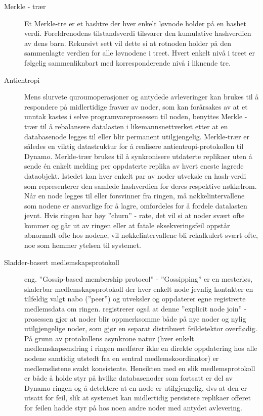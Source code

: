 \begin{description}
  \item [Merkle - trær] Et Merkle-tre er et hashtre der hver enkelt løvnode holder på en hashet verdi. Foreldrenodens tilstandsverdi tilsvarer den kumulative hashverdien av dens barn. Rekursivt sett vil dette si at rotnoden holder på den sammenlagte verdien for alle løvnodene i treet. Hvert enkelt nivå i treet er følgelig sammenliknbart med korresponderende nivå i liknende tre.
  \item [Antientropi] Mens slurvete quroumoperasjoner og antydede avleveringer kan brukes til å respondere på midlertidige fravær av noder, som kan forårsakes av at et unntak kastes i selve programvareprosessen til noden, benyttes Merkle - trær til å rebalansere datalasten i likemannsnettverket etter at en databasenode legges til eller blir permanent utilgjengelig. Merkle-trær er således en viktig datastruktur for å realisere antientropi-protokollen til Dynamo. Merkle-trær brukes til å synkronisere utdaterte replikaer uten å sende én enkelt melding per oppdaterte replika av hvert eneste lagrede dataobjekt. Istedet kan hver enkelt par av noder utveksle en hash-verdi som representerer den samlede hashverdien for deres respektive nøkkelrom. Når en node legges til eller forsvinner fra ringen, må nøkkelintervallene som nodene er ansvarlige for å lagre, omfordeles for å fordele datalasten jevnt. Hvis ringen har høy ''churn'' - rate, det vil si at noder svært ofte kommer og går ut av ringen eller at fatale eksekveringsfeil oppstår abnormalt ofte hos nodene, vil nøkkelintervallene bli rekalkulert svært ofte, noe som hemmer ytelsen til systemet.
  \item [Sladder-basert medlemskapsprotokoll] eng. ''Gossip-based member\-ship protocol'' -  ''Gossipping'' er en mesterløs, skalerbar medlemskapsprotokoll der hver enkelt node jevnlig kontakter en tilfeldig valgt nabo (''peer'') og utveksler og oppdaterer egne registrerte medlemsdata om ringen. \cite{decandia2007} registrerer også at denne ''explicit node join'' - prosessen gjør at noder blir oppmerksomme både på nye noder og nylig utilgjengelige noder, som gjør en separat distribuert feildetektor overflødig. På grunn av protokollens asynkrone natur (hver enkelt medlemskapsendring i ringen medfører ikke en direkte oppdatering hos alle nodene samtidig utstedt fra en sentral medlemskoordinator) er medlemslistene svakt konsistente. Hensikten med en slik medlemsprotokoll er både å holde styr på hvilke databasenoder som fortsatt er del av Dynamo-ringen og å detektere at en node er utilgjengelig, dvs at den er utsatt for feil, slik at systemet kan midlertidig persistere replikaer offeret for feilen hadde styr på hos noen andre noder med antydet avlevering.

\end{description}
